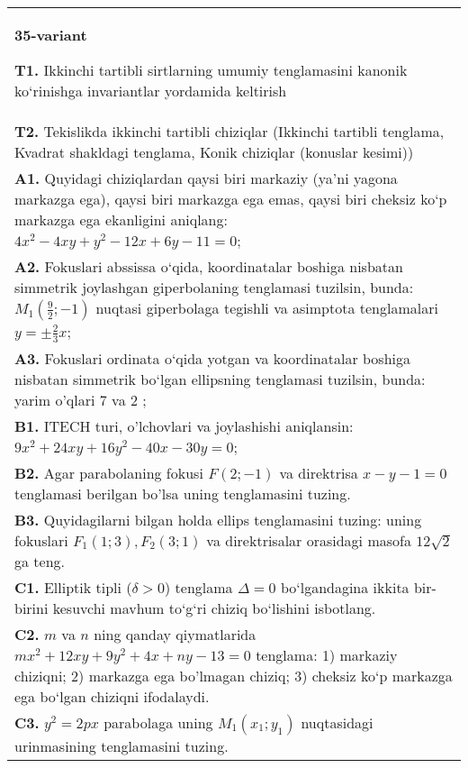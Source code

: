 \documentclass{article}
\begin{document}
\begin{tabular}{m{17cm}}
\textbf{35-variant}
\newline

\textbf{T1.} Ikkinchi tartibli sirtlarning umumiy tenglamasini kanonik ko‘rinishga invariantlar yordamida keltirish \\
\textbf{T2.} Tekislikda ikkinchi tartibli chiziqlar (Ikkinchi tartibli tenglama, Kvadrat shakldagi tenglama, Konik chiziqlar (konuslar kesimi)) \\
\textbf{A1.} Quyidagi chiziqlardan qaysi biri markaziy (ya’ni yagona markazga ega), qaysi biri markazga ega emas, qaysi biri cheksiz ko‘p markazga ega ekanligini aniqlang: $4 x^2-4 x y+y^2-12 x+6 y-11=0$; \\
\textbf{A2.} Fokuslari abssissa o‘qida, koordinatalar boshiga nisbatan simmetrik joylashgan giperbolaning tenglamasi tuzilsin, bunda: $M_1\left(\frac{9}{2} ;-1\right)$ nuqtasi giperbolaga tegishli va asimptota tenglamalari $y= \pm \frac{2}{3} x$; \\
\textbf{A3.} Fokuslari ordinata o‘qida yotgan va koordinatalar boshiga nisbatan simmetrik bo‘lgan ellipsning tenglamasi tuzilsin, bunda: yarim o'qlari 7 va 2 ; \\
\textbf{B1.} ITECH turi, o'lchovlari va joylashishi aniqlansin: $9 x^2+24 x y+16 y^2-40 x-30 y=0$; \\
\textbf{B2.} Agar parabolaning fokusi $F(2;-1) $ va direktrisa $x-y-1=0$ tenglamasi berilgan bo'lsa uning tenglamasini tuzing. \\
\textbf{B3.} Quyidagilarni bilgan holda ellips tenglamasini tuzing: uning fokuslari $F_1 (1; 3), F_2 (3; 1) $ va direktrisalar orasidagi masofa $12 \sqrt{2}$ ga teng. \\
\textbf{C1.} Elliptik tipli ($\delta>0$) tenglama $\Delta=0$ bo‘lgandagina ikkita bir-birini kesuvchi mavhum to‘g‘ri chiziq bo‘lishini isbotlang. \\
\textbf{C2.} $m$ va $n$ ning qanday qiymatlarida $m x^2+12 x y+9 y^2+4 x+n y-13=0$ tenglama: 1) markaziy chiziqni; 2) markazga ega bo'lmagan chiziq; 3) cheksiz ko‘p markazga ega bo‘lgan chiziqni ifodalaydi. \\
\textbf{C3.} $y^2=2 p x$ parabolaga uning $M_1\left(x_1; y_1\right) $ nuqtasidagi urinmasining tenglamasini tuzing. \\

\end{tabular}
\vspace{1cm}
\end{document}
